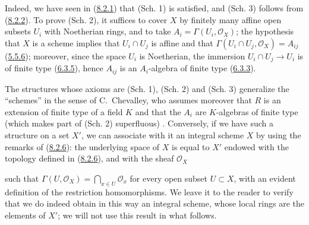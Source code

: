 Indeed, we have seen in (\hyperref[I.8.2.1]{8.2.1}) that (Sch. 1) is
satisfied, and (Sch. 3) follows from (\hyperref[I.8.2.2]{8.2.2}). To
prove (Sch. 2), it suffices to cover $X$ by finitely many affine open
subsets $U_i$ with Noetherian rings, and to take
$A_i=\Gamma(U_i,\mathscr{O}_X)$; the hypothesis that $X$ is a scheme implies
that $U_i\cap U_j$ is affine and that
$\Gamma(U_i\cap U_j,\mathscr{O}_X)=A_{ij}$
(\hyperref[I.5.5.6]{5.5.6}); moreover, since the space $U_i$ is
Noetherian, the immersion $U_i\cap U_j\to U_i$ is of finite type
(\hyperref[I.6.3.5]{6.3.5}), hence $A_{ij}$ is an $A_i$-algebra of finite
type (\hyperref[I.6.3.3]{6.3.3}).

\begin{env}[8.3.2]
\label{I.8.3.2}
The structures whose axioms are (Sch. 1), (Sch. 2) and (Sch. 3)
generalize the ``schemes'' in the sense of C.~Chevalley, who assumes moreover
that $R$ is an extension of finite type of a field $K$ and that the $A_i$ are
$K$-algebras of finite type (which makes part of (Sch. 2) superfluous)
\cite{I-1}. Conversely, if we have such a structure on a set $X'$, we can
associate with it an integral scheme $X$ by using the remarks of
(\hyperref[I.8.2.6]{8.2.6}): the underlying space of $X$ is equal to $X'$
endowed with the topology defined in (\hyperref[I.8.2.6]{8.2.6}), and with
the sheaf $\mathscr{O}_X$

such that $\Gamma(U,\mathscr{O}_X)=\bigcap_{x\in U}\mathscr{O}_x$ for every
open subset $U\subset X$, with an evident definition of the restriction
homomorphisms. We leave it to the reader to verify that we do indeed obtain
in this way an integral scheme, whose local rings are the elements of $X'$;
we will not use this result in what follows.
\end{env}

